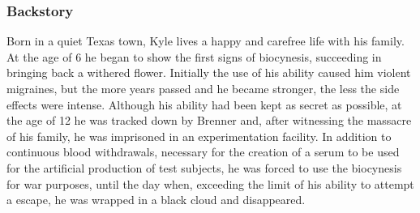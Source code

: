 \subsubsection{Backstory}
Born in a quiet Texas town, Kyle lives a happy and carefree life with his family. At the age of 6 he began to show the first signs of biocynesis, succeeding in bringing back a withered flower. Initially the use of his ability caused him violent migraines, but the more years passed and he became stronger, the less the side effects were intense. Although his ability had been kept as secret as possible, at the age of 12 he was tracked down by Brenner and, after witnessing the massacre of his family, he was imprisoned in an experimentation facility. In addition to continuous blood withdrawals, necessary for the creation of a serum to be used for the artificial production of test subjects, he was forced to use the biocynesis for war purposes, until the day when, exceeding the limit of his ability to attempt a escape, he was wrapped in a black cloud and disappeared.

